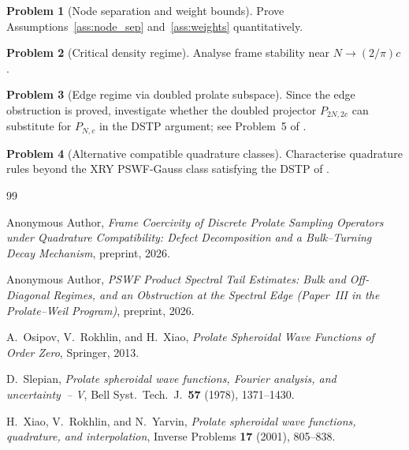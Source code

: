 \documentclass[12pt,a4paper]{amsart}
\theoremstyle{definition}
\newtheorem{problem}{Problem}[section]
\newcommand{\PN}{P_{N,c}}
\begin{document}
\begin{problem}[Node separation and weight bounds]
Prove Assumptions~\ref{ass:node_sep} and~\ref{ass:weights} quantitatively.
\end{problem}

\begin{problem}[Critical density regime]\label{op:critical}
Analyse frame stability near $N\to(2/\pi)c$.
\end{problem}

\begin{problem}[Edge regime via doubled prolate subspace]
Since the edge obstruction is proved, investigate whether the
doubled projector $P_{2N,2c}$ can substitute for $\PN$ in the
DSTP argument; see Problem~5 of \cite{PaperIII}.
\end{problem}

\begin{problem}[Alternative compatible quadrature classes]
Characterise quadrature rules beyond the XRY PSWF-Gauss class satisfying
the DSTP of \cite{PaperI}.
\end{problem}

\begin{thebibliography}{99}

Anonymous Author,
\emph{Frame Coercivity of Discrete Prolate Sampling Operators
under Quadrature Compatibility: Defect Decomposition and a
Bulk--Turning Decay Mechanism},
preprint, 2026.

Anonymous Author,
\emph{PSWF Product Spectral Tail Estimates: Bulk and Off-Diagonal Regimes,
and an Obstruction at the Spectral Edge
(Paper~III in the Prolate--Weil Program)},
preprint, 2026.

A.~Osipov, V.~Rokhlin, and H.~Xiao,
\textit{Prolate Spheroidal Wave Functions of Order Zero}, Springer, 2013.

D.~Slepian,
\textit{Prolate spheroidal wave functions, Fourier analysis, and
uncertainty~-- V},
Bell Syst.\ Tech.\ J.\ \textbf{57} (1978), 1371--1430.

H.~Xiao, V.~Rokhlin, and N.~Yarvin,
\textit{Prolate spheroidal wave functions, quadrature, and interpolation},
Inverse Problems \textbf{17} (2001), 805--838.

\end{thebibliography}
\end{document}
